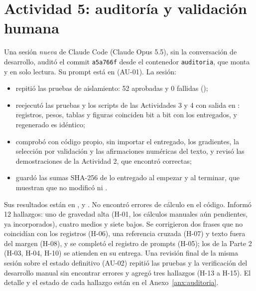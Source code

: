 \documentclass[10pt]{article}
\begin{document}
\section{Actividad 5: auditoría y validación humana}\label{sec:act5}
Una sesión \emph{nueva} de Claude Code (Claude Opus 5.5), sin la conversación de desarrollo, auditó el
commit \texttt{a5a766f} desde el contenedor \texttt{auditoria}, que monta  y
 en solo lectura. Su prompt está en  (AU-01). La sesión:
\begin{sloppypar}
\begin{itemize}[nosep]
  \item repitió las pruebas de aislamiento: 52 aprobadas y 0 fallidas
        ();
  \item reejecutó las pruebas y los scripts de las Actividades 3 y 4 con salida en
        : registros, pesos, tablas y figuras coinciden bit a
        bit con los entregados, y  regenerado es idéntico;
  \item comprobó con código propio, sin importar el entregado, los gradientes, la selección por
        validación y las afirmaciones numéricas del texto, y revisó las demostraciones de la
        Actividad 2, que encontró correctas;
  \item guardó las sumas SHA-256 de lo entregado al empezar y al terminar, que muestran que no
        modificó  ni .
\end{itemize}
\end{sloppypar}
\begin{sloppypar}
Sus resultados están en ,  y
. No encontró errores de cálculo en el código.
Informó 12 hallazgos: uno de gravedad alta (H-01, los cálculos manuales aún pendientes, ya
incorporados), cuatro medios y siete bajos. Se corrigieron dos frases que no coincidían con los
registros (H-06), una referencia cruzada (H-07) y texto fuera del margen (H-08), y se completó el
registro de prompts (H-05); los de la Parte 2 (H-03, H-04, H-10) se atienden en su entrega. Una
revisión final de la misma sesión sobre el estado definitivo (AU-02) repitió las pruebas y la
verificación del desarrollo manual sin encontrar errores y agregó tres hallazgos (H-13 a H-15). El
detalle y el estado de cada hallazgo están en el Anexo~\ref{anx:auditoria}.
\end{sloppypar}
\end{document}
